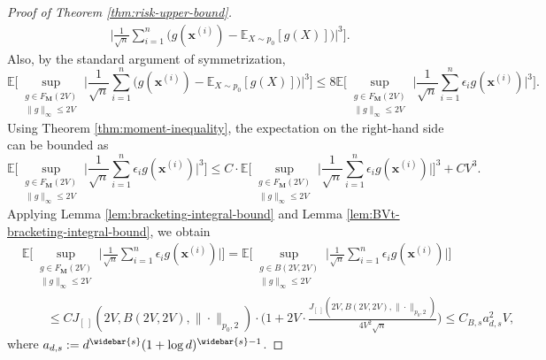 \documentclass[10pt]{article}
\newcommand{\E}{{\mathbb E}}
\newcommand{\xbf}{{\mathbf{x}}}
\newcommand{\Mbf}{{\mathbf{M}}}
\begin{document}
\begin{proof}[Proof of Theorem \ref{thm:risk-upper-bound}]
\begin{equation}
\begin{aligned}
    \Big|\frac{1}{\sqrt{n}} \sum_{i = 1}^{n} \big(g(\xbf^{(i)}) 
    - \E_{X \sim p_0}[g(X)]\big)\Big|^3 \Big]. 
\end{aligned}
\end{equation}
Also, by the standard argument of symmetrization,
\begin{equation}\label{eq:symmetrization-second-case-first-term}
    \E\Big[\sup_{\substack{g \in F_{\Mbf}(2V) \\ \|g\|_{\infty} \le 2V}} 
    \Big|\frac{1}{\sqrt{n}} \sum_{i = 1}^{n} \big(g(\xbf^{(i)}) 
    - \E_{X \sim p_0}[g(X)]\big)\Big|^3 \Big] 
    \le 8 \E\Big[\sup_{\substack{g \in F_{\Mbf}(2V) \\ \|g\|_{\infty} \le 2V}} 
    \Big|\frac{1}{\sqrt{n}} \sum_{i = 1}^{n} 
    \epsilon_i g(\xbf^{(i)}) \Big|^3 \Big].
\end{equation}
Using Theorem \ref{thm:moment-inequality}, the expectation on the right-hand 
side can be bounded as
\begin{equation}\label{eq:moment-inequality-second-case-first-term}
    \E\Big[\sup_{\substack{g \in F_{\Mbf}(2V) \\ \|g\|_{\infty} \le 2V}} 
    \Big|\frac{1}{\sqrt{n}} \sum_{i = 1}^{n} 
    \epsilon_i g(\xbf^{(i)}) \Big|^3 \Big] 
    \le C \cdot \E\Big[\sup_{\substack{g \in F_{\Mbf}(2V) \\ \|g\|_{\infty} \le 2V}} 
    \Big|\frac{1}{\sqrt{n}} \sum_{i = 1}^{n} 
    \epsilon_i g(\xbf^{(i)}) \Big|\Big]^3
    + C V^3. 
\end{equation}
Applying Lemma \ref{lem:bracketing-integral-bound} and 
Lemma \ref{lem:BVt-bracketing-integral-bound}, we obtain
\begin{equation*}
\begin{aligned}
    &\E\Big[\sup_{\substack{g \in F_{\Mbf}(2V) \\ \|g\|_{\infty} \le 2V}} 
    \Big|\frac{1}{\sqrt{n}} \sum_{i = 1}^{n} 
    \epsilon_i g(\xbf^{(i)}) \Big|\Big]
    = \E\Big[\sup_{\substack{g \in B(2V, 2V) \\ \|g\|_{\infty} \le 2V}} 
    \Big|\frac{1}{\sqrt{n}} \sum_{i = 1}^{n} 
    \epsilon_i g(\xbf^{(i)}) \Big|\Big] \\
    &\qquad \le C J_{[ \ ]}(2V, B(2V, 2V), \| \cdot \|_{p_0, 2}) 
    \cdot \Big(1 + 2V \cdot 
    \frac{J_{[ \ ]}(2V, B(2V, 2V), \| \cdot \|_{p_0, 2})}{4V^2 \sqrt{n}}\Big)
    \le C_{B, s} a_{d, s}^2 V,
\end{aligned}
\end{equation*}
where $a_{d, s} := d^{\widebar{s}}(1 + \log d)^{\widebar{s} - 1}$.

\end{proof}
\end{document}
